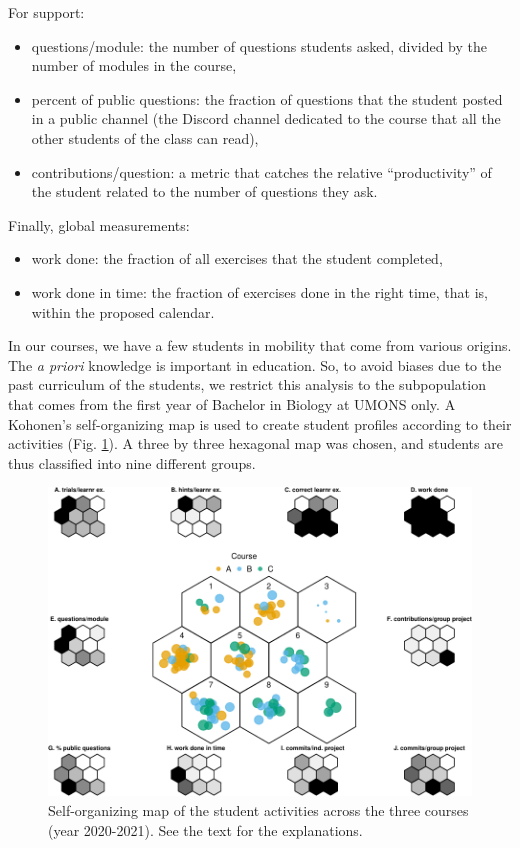 \documentclass{aims}
\theoremstyle{definition}
\begin{document}
For support:

\begin{itemize}
\item
  questions/module: the number of questions students asked, divided by
  the number of modules in the course,
\item
  percent of public questions: the fraction of questions that the
  student posted in a public channel (the Discord channel dedicated to
  the course that all the other students of the class can read),
\item
  contributions/question: a metric that catches the relative
  ``productivity'' of the student related to the number of questions
  they ask.
\end{itemize}

Finally, global measurements:

\begin{itemize}
\item
  work done: the fraction of all exercises that the student completed,
\item
  work done in time: the fraction of exercises done in the right time,
  that is, within the proposed calendar.
\end{itemize}

In our courses, we have a few students in mobility that come from
various origins. The \emph{a priori} knowledge is important in
education. So, to avoid biases due to the past curriculum of the
students, we restrict this analysis to the subpopulation that comes from
the first year of Bachelor in Biology at UMONS only. A Kohonen's
self-organizing map is used to create student profiles according to
their activities (Fig. \ref {fig:fig_som}). A three by three hexagonal
map was chosen, and students are thus classified into nine different
groups.

\begin{figure}
\includegraphics[width=1\linewidth]{teaching_data_science_files/figure-latex/fig_som-1} \caption{\label{fig:fig_som} Self-organizing map of the student activities across the three courses (year 2020-2021). See the text for the explanations.}\label{fig:fig_som}
\end{figure}
\end{document}
